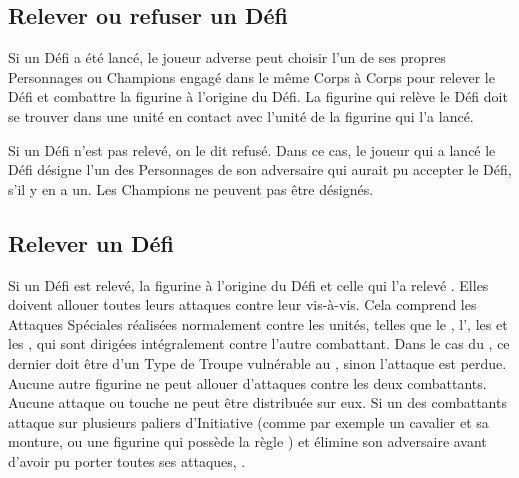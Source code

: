 \subsection{Relever ou refuser un Défi}

Si un Défi a été lancé, le joueur adverse peut choisir l'un de ses propres Personnages ou Champions engagé dans le même Corps à Corps pour relever le Défi et combattre la figurine à l'origine du Défi. La figurine qui relève le Défi doit se trouver dans une unité en contact avec l'unité de la figurine qui l'a lancé.

Si un Défi n'est pas relevé, on le dit refusé. Dans ce cas, le joueur qui a lancé le Défi désigne l'un des Personnages de son adversaire qui aurait pu accepter le Défi, s'il y en a un. Les Champions ne peuvent pas être désignés. 

\subsection{Relever un Défi}

Si un Défi est relevé, la figurine à l'origine du Défi et celle qui l'a relevé . Elles doivent allouer toutes leurs attaques contre leur vis-à-vis. Cela comprend les Attaques Spéciales réalisées normalement contre les unités, telles que le \stomp{}, l'\breathweapon{}, les \impacthits{} et les \grindingattacks{}, qui sont dirigées intégralement contre l'autre combattant. Dans le cas du \stomp{}, ce dernier doit être d'un Type de Troupe vulnérable au \stomp{}, sinon l'attaque est perdue. Aucune autre figurine ne peut allouer d'attaques contre les deux combattants. Aucune attaque ou touche ne peut être distribuée sur eux. Si un des combattants attaque sur plusieurs paliers d'Initiative (comme par exemple un cavalier et sa monture, ou une figurine qui possède la règle \stomp{}) et élimine son adversaire avant d'avoir pu porter toutes ses attaques, .

